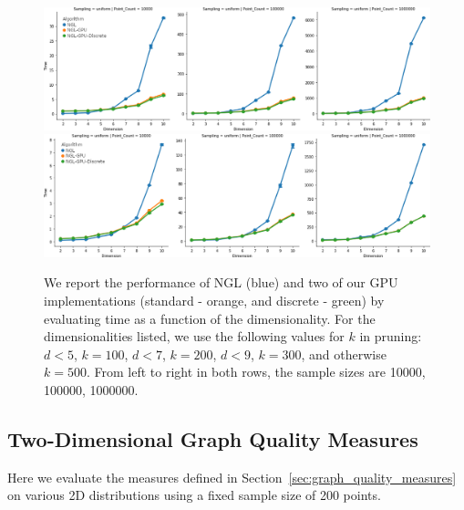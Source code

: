 \begin{figure}[htbp]
    \includegraphics[width=\linewidth]{figs/chap7/strict_performance_d.png}
    \includegraphics[width=\linewidth]{figs/chap7/relaxed_performance_d.png}
    \caption[Performance of GPU versus serial implementation of Gabriel Graph]{We report the performance of NGL (blue) and two of our GPU
    implementations (standard - orange, and discrete - green) by
    evaluating time as a function of the dimensionality. For the
    dimensionalities listed, we use the following values for $k$ in
    pruning: $d < 5$, $k=100$, $d < 7$, $k=200$, $d < 9$, $k=300$, and
    otherwise $k=500$. From left to right in both rows, the sample sizes
    are 10000, 100000, 1000000.}
    \label{fig:performance}
\end{figure}

\subsection{Two-Dimensional Graph Quality Measures}

Here we evaluate the measures defined in Section~\ref{sec:graph_quality_measures}
on various 2D distributions using a fixed sample size of 200 points.

